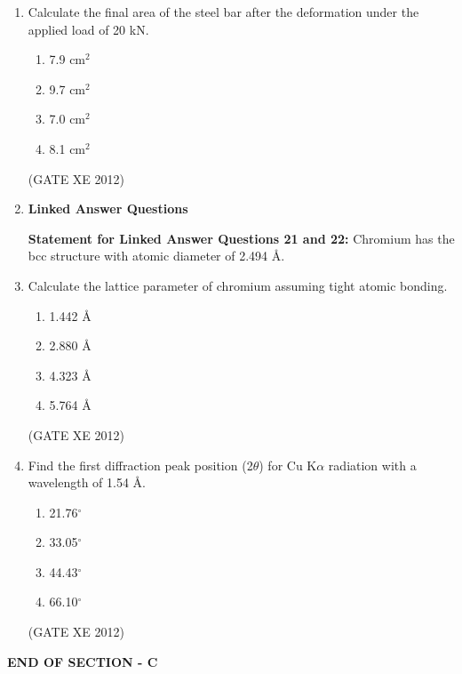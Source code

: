 \documentclass[12pt]{article}
\begin{document}
\begin{enumerate}
  \item Calculate the final area of the steel bar after the deformation under the applied load of 20 kN.
  \begin{multicols}{4}
    \begin{enumerate}
      \item 7.9 cm$^2$
      \item 9.7 cm$^2$
      \item 7.0 cm$^2$
      \item 8.1 cm$^2$
    \end{enumerate}
  \end{multicols}
  (GATE XE 2012)

  \item[] {\large \textbf{Linked Answer Questions}} 
  
  \textbf{Statement for Linked Answer Questions 21 and 22:} Chromium has the bcc structure with atomic diameter of 2.494 \AA.

  \item Calculate the lattice parameter of chromium assuming tight atomic bonding.
  \begin{multicols}{4}
    \begin{enumerate}
      \item 1.442 \AA
      \item 2.880 \AA
      \item 4.323 \AA
      \item 5.764 \AA
    \end{enumerate}
  \end{multicols}
  (GATE XE 2012)

  \item Find the first diffraction peak position (2$\theta$) for Cu K$\alpha$ radiation with a wavelength of 1.54 \AA.
  \begin{multicols}{4}
    \begin{enumerate}
      \item 21.76$^\circ$
      \item 33.05$^\circ$
      \item 44.43$^\circ$
      \item 66.10$^\circ$
    \end{enumerate}
  \end{multicols}
  (GATE XE 2012)

\end{enumerate}
\begin{center}
\textbf{END OF SECTION - C}
\end{center}
\end{document}
